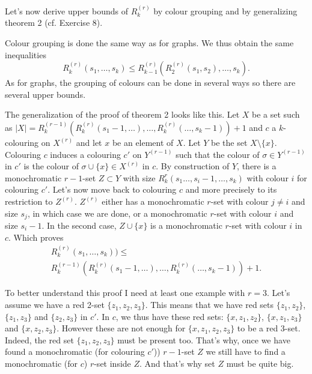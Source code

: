 \medskip

Let's now derive upper bounds of $R_k^{(r)}$ by colour grouping and by generalizing theorem 2 (cf. Exercise 8).

Colour grouping is done the same way as for graphs. We thus obtain the same inequalities
\begin{equation}
    R_k^{(r)}(s_1,\dots,s_k) \leq R_{k-1}^{(r)}(R_2^{(r)}(s_1,s_2),\dots,s_k) .
\end{equation}
As for graphs, the grouping of colours can be done in several ways so there are several upper bounds.

The generalization of the proof of theorem 2 looks like this.
Let $X$ be a set such as $\left|X\right| = R_k^{(r-1)}(R_k^{(r)}(s_1-1,\dots),\dots,R_k^{(r)}(\dots,s_k-1))+1$ and $c$ a $k$-colouring on $X^{(r)}$
and let $x$ be an element of $X$.
Let $Y$ be the set $X \setminus \{x\}$.
Colouring $c$ induces a colouring $c'$ on $Y^{(r-1)}$ such that the colour of $\sigma \in Y^{(r-1)}$ in $c'$ is the colour of $\sigma \cup \{x\} \in X^{(r)}$ in $c$.
By construction of $Y$, there is a monochromatic $r-1$-set $Z \subset Y$ with size $R_k^{r}(s_1\dots,s_i-1,\dots,s_k)$ with colour $i$ for colouring $c'$.
Let's now move back to colouring $c$ and more precisely to its restriction to $Z^{(r)}$.
$Z^{(r)}$ either has a monochromatic $r$-set with colour $j \neq i$ and size $s_j$, in which case we are done, or a monochromatic $r$-set with colour $i$ and size $s_i-1$.
In the second case, $Z \cup \{x\}$ is a monochromatic $r$-set with colour $i$ in $c$.
Which proves
\begin{multline}
    R_k^{(r)}(s_1,\dots,s_k)) \leq \\
    R_k^{(r-1)}(R_k^{(r)}(s_1-1,\dots),\dots,R_k^{(r)}(\dots,s_k-1)) + 1 .
\end{multline}

To better understand this proof I need at least one example with $r=3$.
Let's assume we have a red 2-set $\{z_1,z_2,z_3\}$.
This means that we have red sets $\{z_1,z_2\}$, $\{z_1,z_3\}$ and $\{z_2,z_3\}$ in $c'$.
In $c$, we thus have these red sets: $\{x,z_1,z_2\}$, $\{x,z_1,z_3\}$ and $\{x,z_2,z_3\}$.
However these are not enough for $\{x,z_1,z_2,z_3\}$ to be a red 3-set.
Indeed, the red set $\{z_1,z_2,z_3\}$ must be present too.
That's why, once we have found a monochromatic (for colouring $c'$)) $r-1$-set $Z$ we still have to find a monochromatic (for $c$) $r$-set inside $Z$.
And that's why set $Z$ must be quite big.